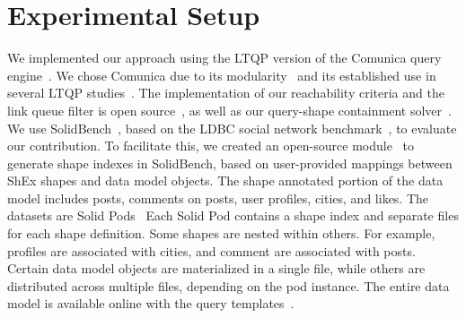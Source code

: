 \section{Experimental Setup}







We implemented our approach using the LTQP version of the Comunica query engine~\cite{taelman_iswc_resources_comunica_2018}.
We chose Comunica due to its modularity~\cite{taelman_swj_componentsjs_2022} and its established use in several LTQP studies~\cite{Bogaerts2021LinkTW, Taelman2023, eschauzier_quweda_linkqueue_2023, Hanski2024, eschauzier_amw_rcubemetric_2024, tam2024opportunitiesshapebasedoptimizationlink}.
The implementation of our reachability criteria and the link queue filter is open source~, as well as our query-shape containment solver~.
We use SolidBench~\cite{Taelman2023}, based on the LDBC social network benchmark~\cite{Angles2020}, to evaluate our contribution. 
To facilitate this, we created an open-source module~ to generate shape indexes in SolidBench, based on user-provided mappings between ShEx shapes and data model objects.
The shape annotated portion of the data model includes posts, comments on posts, user profiles, cities, and likes.
The datasets are Solid Pods~\cite{Taelman2023}
Each Solid Pod contains a shape index and separate files for each shape definition.
Some shapes are nested within others. 
For example, profiles are associated with cities, and comment are associated with posts.
Certain data model objects are materialized in a single file, while others are distributed across multiple files, depending on the pod instance.
The entire data model is available online with the query templates~.

